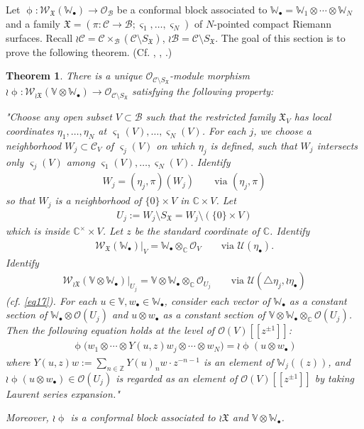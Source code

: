 \documentclass[12pt,a4paper,notitlepage]{article}
\theoremstyle{definition}
\theoremstyle{plain}
\newtheorem{thm}[df]{Theorem}
\newcommand{\fk}{\mathfrak}
\newcommand{\mc}{\mathcal}
\newcommand{\scr}{\mathscr}
\newcommand{\sgm}{\varsigma}
\newcommand{\SX}{{S_{\fk X}}}
\newcommand{\blt}{\bullet}
\newcommand{\Vbb}{\mathbb V}
\newcommand{\Wbb}{\mathbb W}
\newcommand{\Cbb}{\mathbb C}
\newcommand{\Zbb}{\mathbb Z}
\numberwithin{equation}{section}
\begin{document}
Let $\upphi:\scr W_{\fk X}(\Wbb_\blt)\rightarrow\scr O_{\mc B}$ be a conformal block associated to $\Wbb_\blt=\Wbb_1\otimes\cdots\otimes\Wbb_N$ and a family $\fk X=(\pi:\mc C\rightarrow\mc B;\sgm_1,\dots,\sgm_N)$ of $N$-pointed compact Riemann surfaces. Recall $\wr\mc C=\mc C\times_{\mc B}(\mc C\setminus\SX)$, $\wr\mc B=\mc C\setminus\SX$. The goal of this section is to prove the following theorem. (Cf. \cite[Sec. 6]{Zhu94}, \cite[Thm. 10.3.1]{FB04}, \cite[Thm. 3.6]{Cod19}.) 

\begin{thm}\label{lb4}
There is a unique $\scr O_{\mc C\setminus\SX}$-module morphism $\wr\upphi:\scr W_{\wr\fk X}(\Vbb\otimes\Wbb_\blt)\rightarrow\scr O_{\mc C\setminus\SX}$ satisfying the  following property: 

"Choose any open subset $V\subset\mc B$  such that the restricted family $\fk X_V$ has local coordinates $\eta_1,\dots,\eta_N$ at $\sgm_1(V),\dots,\sgm_N(V)$. For each $j$, we choose a neighborhood $W_j\subset\mc C_V$ of $\sgm_j(V)$ on which $\eta_j$ is defined, such that $W_j$ intersects only $\sgm_j(V)$ among $\sgm_1(V),\dots,\sgm_N(V)$. Identify 
\begin{align*}
W_j=(\eta_j,\pi)(W_j)	\qquad\text{via }(\eta_j,\pi)
\end{align*}
so that $W_j$ is a neighborhood of $\{0\}\times V$ in $\Cbb\times V$. Let
\begin{align*}
U_j:=W_j\setminus\SX=W_j\setminus(\{0\}\times V)	
\end{align*}
which is inside $\Cbb^\times\times V$. Let $z$ be the standard coordinate of $\Cbb$. Identify
\begin{align*}
\scr W_{\fk X}(\Wbb_\blt)\big|_V=\Wbb_\blt\otimes_\Cbb\scr O_V	\qquad\text{via }\mc U(\eta_\blt).
\end{align*}
Identify 
\begin{align}
\scr W_{\wr\fk X}(\Vbb\otimes\Wbb_\blt)\big|_{U_j}=\Vbb\otimes\Wbb_\blt\otimes_\Cbb\scr O_{U_j}\qquad\text{via }\mc U(\triangle\eta_j,\wr\eta_\blt)\label{eq25}	
\end{align}
(cf. \eqref{eq17}). For each $u\in\Vbb,w_\blt\in\Wbb_\blt$, consider each vector of $\Wbb_\blt$ as a constant section of $\Wbb_\blt\otimes\scr O(U_j)$ and  $u\otimes w_\blt$ as a constant section of $\Vbb\otimes\Wbb_\blt\otimes_\Cbb\scr O(U_j)$. Then the following equation holds at the level of $\scr O(V)[[z^{\pm 1}]]$:
\begin{align}
\boxed{~\upphi\big(w_1\otimes\cdots\otimes Y(u,z)w_j\otimes\cdots\otimes w_N\big)=\wr\upphi(u\otimes w_\blt)~}\label{eq18}
\end{align}
where $Y(u,z)w:=\sum_{n\in\Zbb}Y(u)_nw\cdot z^{-n-1}$  is an element of $\Wbb_j((z))$, and  $\wr\upphi(u\otimes w_\blt)\in \scr O(U_j)$ is regarded as an element of $\scr O(V)[[z^{\pm 1}]]$ by taking Laurent series expansion."

Moreover, $\wr\upphi$ is a conformal block associated to $\wr\fk X$ and $\Vbb\otimes\Wbb_\blt$.
\end{thm}
\end{document}
